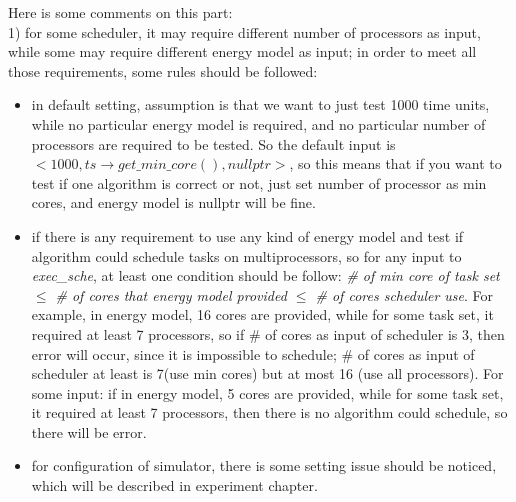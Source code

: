 \documentclass[11pt, oneside]{article}
\begin{document}
Here is some comments on this part: \\
1) for some scheduler, it may require different number of processors as input, while some may require different energy model as input; in order to meet all those requirements, some rules should be followed:
\begin{itemize}
\item in default setting, assumption is that we want to just test 1000 time units, while no particular energy model is required, and no particular number of processors are required to be tested. So the default input is $<1000, ts\to get\_min\_core(), nullptr>$, so this means that if you want to test if one algorithm is correct or not, just set number of processor as min cores, and energy model is nullptr will be fine.
\item if there is any requirement to use any kind of energy model and test if algorithm could schedule tasks on multiprocessors, so for any input to \textit{exec\_sche}, at least one condition should be follow: \textit{\# of min core of task set $\leq$ \# of cores that energy model provided $\leq$ \# of cores scheduler use}. For example, in energy model, 16 cores are provided, while for some task set, it required at least 7 processors, so if \# of cores as input of scheduler is 3, then error will occur, since it is impossible to schedule; \# of cores as input of scheduler at least is 7(use min cores) but at most 16 (use all processors). For some input: if in energy model, 5 cores are provided, while for some task set, it required at least 7 processors, then there is no algorithm could schedule, so there will be error. 
\item for configuration of simulator, there is some setting issue should be noticed, which will be described in experiment chapter.
\end{itemize}
\end{document}
